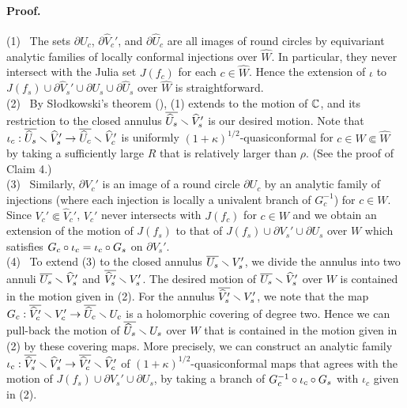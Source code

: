 \paragraph{\bf Proof.} 
(1)~
The sets $\partial U_c$, 
$\partial \widehat{V}_c'$, and 
$\partial \widehat{U}_c$ are all images of round circles
by equivariant analytic families of locally conformal injections 
over $\widehat{W}$.
In particular, they never intersect with the Julia set $J(f_c)$
for each $c \in \widehat{W}$.
Hence the extension of $\iota$ to 
$J(f_s) \cup \partial \widehat{V}_s' \cup \partial U_s
\cup \partial \widehat{U}_s$
 over $\widehat{W}$ is straightforward.\\
(2)~
By S\l odkowski's theorem (\cite{Slodkowski 1991}), 
(1) extends to the motion of $\mathbb C$,
and its restriction to 
the closed annulus $\overline{\widehat{U}_s} \smallsetminus \widehat{V}_s'$
is our desired motion.
Note that 
$\iota_c:\overline{\widehat{U}_s} \smallsetminus \widehat{V}_s'
\to \overline{\widehat{U}_c} \smallsetminus \widehat{V}_c'$ 
is uniformly $(1+\kappa)^{1/2}$-quasiconformal 
for $c \in W \Subset \widehat{W}$ by taking a sufficiently large $R$
that is relatively larger than $\rho$. (See the proof of Claim 4.) \\
(3)~
Similarly, $\partial V_c'$ is an image of a round circle 
$\partial U_c$ by an analytic family of injections
(where each injection is locally a univalent branch of $G_c^{-1}$) 
for $c \in W$.
Since $V_c' \Subset \widehat{V}_c'$, 
$V_c'$ never intersects with $J(f_c)$
for $c \in W$ and 
we obtain an extension of the motion of $J(f_s)$
to that of $J(f_s) \cup \partial V_s' \cup \partial U_s$ over $W$ 
which satisfies $G_c \circ \iota_c=\iota_c \circ G_s$
on $\partial V_s'$. \\
(4)~
To extend (3) to the closed annulus 
$\overline{{U}_s} \smallsetminus {V}_s'$, 
we divide the annulus into two annuli 
$\overline{{U}_s} \smallsetminus \widehat{V}_s'$ and 
$\overline{\widehat{V}_s'} \smallsetminus {V}_s'$.
The desired motion of $\overline{{U}_s} \smallsetminus \widehat{V}_s'$ over $W$
is contained in the motion given in (2).
For the annulus $\overline{\widehat{V}_s'} \smallsetminus {V}_s'$,
we note that the map 
$G_c: \overline{\widehat{V}_c'} \smallsetminus {V}_c' \to \overline{\widehat{U}_c} \smallsetminus {U}_c$
is a holomorphic covering of degree two.
Hence we can pull-back the motion of $\overline{\widehat{U}_s} \smallsetminus {U}_s$ 
over $W$ that is contained in the motion given in (2)
by these covering maps.
More precisely, we can construct  
an analytic family 
$\iota_c:\overline{\widehat{V}_s'} \smallsetminus \widehat{V}_s' \to 
\overline{\widehat{V}_c'} \smallsetminus \widehat{V}_c'$ of 
$(1+\kappa)^{1/2}$-quasiconformal maps 
that agrees with the motion of $J(f_s) \cup \partial V_s' \cup \partial U_s$,
by taking a branch of 
$G_c^{-1} \circ \iota_c\circ G_s$
with $\iota_c$ given in (2).
\QED


